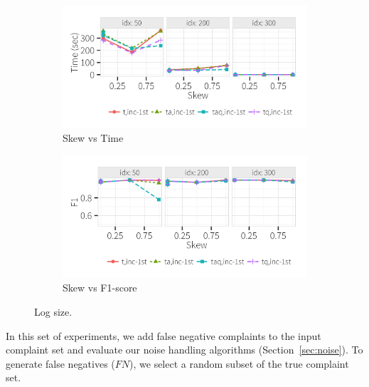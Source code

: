   \begin{figure}[h]
    \centering
    \begin{subfigure}[t]{.9\columnwidth}
    \includegraphics[width = \columnwidth]{figures/skew_time}
    \caption{Skew vs Time}
    \label{f:multiquery} 
    \end{subfigure}
    \begin{subfigure}[t]{.9\columnwidth}
    \includegraphics[width = \columnwidth]{figures/skew_acc}
    \caption{Skew vs F1-score}
    \label{f:multiquery} 
    \end{subfigure}
    \caption{Log size. }
  \end{figure}





In this set of experiments, we add false negative complaints to the input
complaint set and evaluate our noise handling algorithms (Section~\ref{sec:noise}).
To generate false negatives ($FN$), we select a random subset of the true complaint set.


